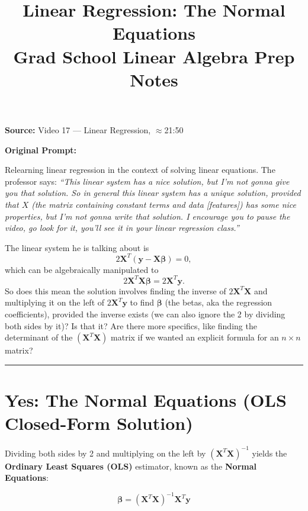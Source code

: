 \documentclass[12pt]{article}
\title{Linear Regression: The Normal Equations\\
\large Grad School Linear Algebra Prep Notes}
\author{}
\date{}
\begin{document}
\maketitle
 
\noindent\textbf{Source:} Video 17 --- Linear Regression, $\approx$21:50
 
\medskip
 
\begin{mdframed}[linewidth=1pt, innertopmargin=10pt, innerbottommargin=10pt, innerrightmargin=10pt, innerleftmargin=10pt]
\noindent\textbf{Original Prompt:}
 
\medskip
\noindent Relearning linear regression in the context of solving linear equations. The professor says: \textit{``This linear system has a nice solution, but I'm not gonna give you that solution. So in general this linear system has a unique solution, provided that $X$ (the matrix containing constant terms and data [features]) has some nice properties, but I'm not gonna write that solution. I encourage you to pause the video, go look for it, you'll see it in your linear regression class.''}
 
\medskip
\noindent The linear system he is talking about is
\[
2\mathbf{X}^T(\mathbf{y} - \mathbf{X}\boldsymbol{\beta}) = 0,
\]
which can be algebraically manipulated to
\[
2\mathbf{X}^T\mathbf{X}\boldsymbol{\beta} = 2\mathbf{X}^T\mathbf{y}.
\]
So does this mean the solution involves finding the inverse of $2\mathbf{X}^T\mathbf{X}$ and multiplying it on the left of $2\mathbf{X}^T\mathbf{y}$ to find $\boldsymbol{\beta}$ (the betas, aka the regression coefficients), provided the inverse exists (we can also ignore the 2 by dividing both sides by it)? Is that it? Are there more specifics, like finding the determinant of the $(\mathbf{X}^T\mathbf{X})$ matrix if we wanted an explicit formula for an $n \times n$ matrix?
\end{mdframed}
 
\bigskip
\hrule
\bigskip
 
\section*{Yes: The Normal Equations (OLS Closed-Form Solution)}
 
Dividing both sides by 2 and multiplying on the left by $(\mathbf{X}^T\mathbf{X})^{-1}$ yields the \textbf{Ordinary Least Squares (OLS)} estimator, known as the \textbf{Normal Equations}:
 
\[
\boxed{\boldsymbol{\beta} = (\mathbf{X}^T\mathbf{X})^{-1}\mathbf{X}^T\mathbf{y}}
\]
 
\end{document}
